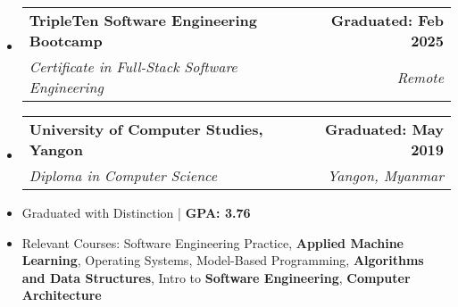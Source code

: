 \documentclass[letterpaper,11pt]{article}
\makeatletter
\newcommand{\resumeItem}[1]{
  \item\small{
    {#1 \vspace{0pt}}
  }
}
\newcommand{\resumeSubheading}[4]{
  \vspace{-2pt}\item
    \begin{tabular*}{1.0\textwidth}[t]{l@{\extracolsep{\fill}}r}
      \textbf{#1} & \textbf{\small #2} \\
      \textit{\small#3} & \textit{\small #4} \\
    \end{tabular*}\vspace{-7pt}
}
\newcommand{\resumeSubHeadingListStart}{\begin{itemize}[leftmargin=0.0in, label={}]}
\newcommand{\resumeSubHeadingListEnd}{\end{itemize}}\vspace{0pt}
\newcommand{\resumeItemListStart}{\begin{itemize}}
\newcommand{\resumeItemListEnd}{\end{itemize}\vspace{-5pt}}
\makeatother
\begin{document}
\resumeSubHeadingListStart
  \vspace{1pt}
  \resumeSubheading
    {TripleTen Software Engineering Bootcamp}{Graduated: Feb 2025}
    {Certificate in Full-Stack Software Engineering}{Remote}
\resumeSubHeadingListEnd

\vspace{-4pt}

  \resumeSubHeadingListStart
   \vspace{1pt}
   \resumeSubheading
    {University of Computer Studies, Yangon}{Graduated: May 2019}
    {Diploma in Computer Science}{Yangon, Myanmar}
  \resumeSubHeadingListEnd
    \resumeItemListStart
         \resumeItem{Graduated with Distinction | \textbf{GPA: 3.76}}
            \vspace{-6pt}
         \resumeItem{Relevant Courses: Software Engineering Practice, \textbf{Applied Machine Learning}, Operating Systems, Model-Based Programming, \textbf{Algorithms and Data Structures}, Intro to \textbf{Software Engineering}, \textbf{Computer Architecture}}
    \resumeItemListEnd

    
    \vspace{-12pt}
\end{document}
